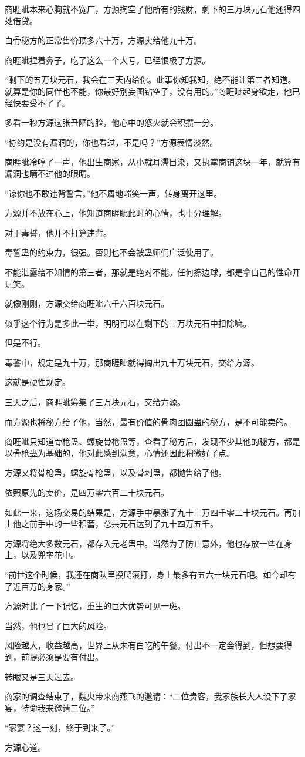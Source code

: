 \begin{this_body}
商睚眦本来心胸就不宽广，方源掏空了他所有的钱财，剩下的三万块元石他还得四处借贷。

白骨秘方的正常售价顶多六十万，方源卖给他九十万。

商睚眦捏着鼻子，吃了这么一个大亏，已经恨极了方源。

“剩下的五万块元石，我会在三天内给你。此事你知我知，绝不能让第三者知道。就算是你的同伴也不能，你最好别妄图钻空子，没有用的。”商睚眦起身欲走，他已经快要受不了了。

多看一秒方源这张丑陋的脸，他心中的怒火就会积攒一分。

“协约是没有漏洞的，你也看过，不是吗？”方源表情淡然。

商睚眦冷哼了一声，他出生商家，从小就耳濡目染，又执掌商铺这块一年，就算有漏洞也瞒不过他的眼睛。

“谅你也不敢违背誓言。”他不屑地嗤笑一声，转身离开这里。

方源并不放在心上，他知道商睚眦此时的心情，也十分理解。

对于毒誓，他并不打算违背。

毒誓蛊的约束力，很强。否则也不会被蛊师们广泛使用了。

不能泄露给不知情的第三者，那就是绝对不能。任何擦边球，都是拿自己的性命开玩笑。

就像刚刚，方源交给商睚眦六千六百块元石。

似乎这个行为是多此一举，明明可以在剩下的三万块元石中扣除嘛。

但是不行。

毒誓中，规定是九十万，那商睚眦就得掏出九十万块元石，交给方源。

这就是硬性规定。

三天之后，商睚眦筹集了三万块元石，交给方源。

而方源也将秘方给了他，当然，最有价值的骨肉团圆蛊的秘方，是不可能卖的。

商睚眦只知道骨枪蛊、螺旋骨枪蛊等，查看了秘方后，发现不少其他的秘方，都是以骨枪蛊为基础的，他对此感到满意，心情还因此稍微好了点。

方源又将骨枪蛊，螺旋骨枪蛊，以及骨刺蛊，都抛售给了他。

依照原先的卖价，是四万零六百二十块元石。

如此一来，这场交易的结果是，方源手中暴涨了九十三万四千零二十块元石。再加上他之前手中的一些积蓄，总共元石达到了九十四万五千。

方源将绝大多数元石，都存入元老蛊中。当然为了防止意外，他也存放一些在身上，以及兜率花中。

“前世这个时候，我还在商队里摸爬滚打，身上最多有五六十块元石吧。如今却有了近百万的身家。”

方源对比了一下记忆，重生的巨大优势可见一斑。

当然，他也冒了巨大的风险。

风险越大，收益越高，世界上从未有白吃的午餐。付出不一定会得到，但想要得到，前提必须是要有付出。

转眼又是三天过去。

商家的调查结束了，魏央带来商燕飞的邀请：“二位贵客，我家族长大人设下了家宴，特命我来邀请二位。”

“家宴？这一刻，终于到来了。”

方源心道。

\end{this_body}


